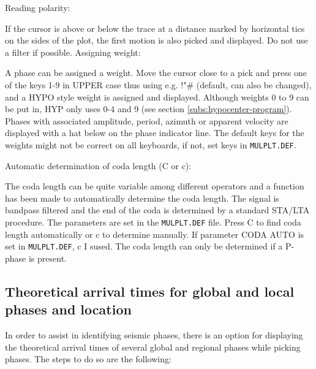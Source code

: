 Reading polarity: 

If the cursor is above or below the trace at a distance marked by horizontal tics on the sides of the plot, the first motion is also picked and displayed. Do not use a filter if possible.  
Assigning weight: 

A phase can be assigned a weight. Move the cursor close to a pick and press one of the keys 1-9 in UPPER case thus using e.g. !"\# (default, can also be changed), and a HYPO style weight is assigned and displayed. Although weights 0 to 9 can be put in, HYP only uses 0-4 and 9 (see section \ref{subs:hypocenter-program}). Phases with associated amplitude, period, azimuth or apparent velocity are displayed with a hat below on the phase indicator line. The default keys for the weights might not be correct on all keyboards, if not, set keys in \texttt{MULPLT.DEF}.  

Automatic determination of coda length (C or c): 

The coda length can be quite variable among different operators and a function has been made to automatically determine the coda length. The signal is bandpass filtered and the end of the coda is determined by a standard STA/LTA procedure. The parameters are set in the \texttt{MULPLT.DEF} file. Press C to find coda length automatically or c to determine manually. If parameter CODA AUTO is set in \texttt{MULPLT.DEF}, c I sused. The coda length can only be determined if a P-phase is present. 

\subsection{Theoretical arrival times for global and local phases and location}

In order to assist in identifying seismic phases, there is an option for displaying the theoretical arrival times of several global and regional phases while picking phases. The steps to do so are the following: 


